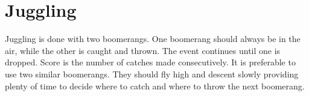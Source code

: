 \section{Juggling}
Juggling is done with two boomerangs. One boomerang should always be in the air, while the other is caught and thrown. The event continues until one is dropped. Score is the number of catches made consecutively. It is preferable to use two similar boomerangs. They should fly high and descent slowly providing plenty of time to decide where to catch and where to throw the next boomerang.





